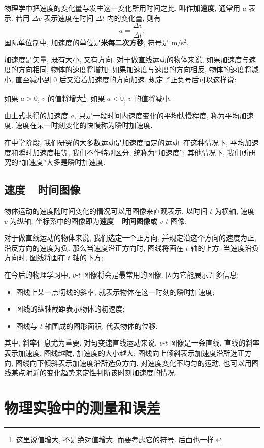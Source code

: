 \documentclass[UTF8,openany,fontset=fandol]{ctexbook}
\theoremstyle{chinesetextbook}
\begin{document}
物理学中把速度的变化量与发生这一变化所用时间之比, 叫作\textbf{加速度}, 通常用 $a$ 表示. 若用 $\Delta v$ 表示速度在时间 $\Delta t$ 内的变化量, 则有
\begin{equation}\label{eq:加速度的定义}
a=\frac{\Delta v}{\Delta t}.
\end{equation}
国际单位制中, 加速度的单位是\textbf{米每二次方秒}, 符号是 $\mathrm{m/s^2}$.

加速度是矢量, 既有大小, 又有方向. 对于做直线运动的物体来说, 如果加速度与速度的方向相同, 物体的速度将增加; 如果加速度与速度的方向相反, 物体的速度将减小, 直至减小到 0 后又沿着加速度的方向加速. 规定了正负号后可以这样说:

如果 $a>0$, $v$ 的值将增大\footnote{这里说值增大, 不是绝对值增大, 而要考虑它的符号. 后面也一样.}; 如果 $a<0$, $v$ 的值将减小.

由上式求得的加速度 $a$, 只是一段时间内速度变化的平均快慢程度, 称为平均加速度. 速度在某一时刻变化的快慢称为瞬时加速度.

在中学阶段, 我们研究的大多数运动是加速度恒定的运动. 在这种情况下, 平均加速度和瞬时加速度相等, 我们不作特别区分, 统称为“加速度”; 其他情况下, 我们所研究的“加速度”大多是瞬时加速度.
\subsection{速度—时间图像}
物体运动的速度随时间变化的情况可以用图像来直观表示. 以时间 $t$ 为横轴, 速度 $v$ 为纵轴, 坐标系中的图像即为\textbf{速度—时间图像}或 $v$-$t$ 图像.

对于做直线运动的物体来说, 我们选定一个正方向, 并规定沿这个方向的速度为正, 沿反方向的速度为负. 那么当速度沿正方向时, 图线将画在 $t$ 轴的上方; 当速度沿负方向时, 图线将画在 $t$ 轴的下方;

在今后的物理学习中, $v$-$t$ 图像将会是最常用的图像. 因为它能展示许多信息:
\begin{itemize}
\item 图线上某一点切线的斜率, 就表示物体在这一时刻的瞬时加速度;
\item 图线的纵轴截距表示物体的初速度;
\item 图线与 $t$ 轴围成的图形面积, 代表物体的位移.
\end{itemize}

其中, 斜率信息尤为重要. 对匀变速直线运动来说, $v$-$t$ 图像是一条直线, 直线的斜率表示加速度. 图线越陡, 加速度的大小越大; 图线向上倾斜表示加速度沿所选正方向, 图线向下倾斜表示加速度沿所选负方向. 对速度变化不均匀的运动, 也可以用图线某点附近的变化趋势来定性判断该时刻加速度的情况.
\section{物理实验中的测量和误差}
\end{document}
